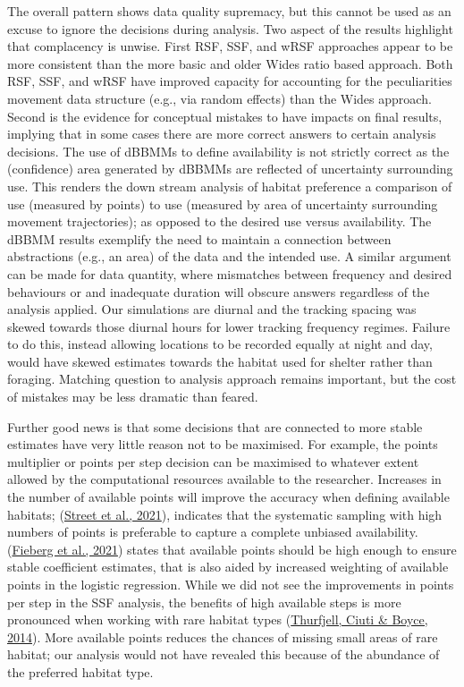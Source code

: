 \documentclass[10pt,a4paper]{article}
\begin{document}
The overall pattern shows data quality supremacy, but this cannot be used as an excuse to ignore the decisions during analysis.
Two aspect of the results highlight that complacency is unwise.
First RSF, SSF, and wRSF approaches appear to be more consistent than the more basic and older Wides ratio based approach.
Both RSF, SSF, and wRSF have improved capacity for accounting for the peculiarities movement data structure (e.g., via random effects) than the Wides approach.
Second is the evidence for conceptual mistakes to have impacts on final results, implying that in some cases there are more correct answers to certain analysis decisions.
The use of dBBMMs to define availability is not strictly correct as the (confidence) area generated by dBBMMs are reflected of uncertainty surrounding use.
This renders the down stream analysis of habitat preference a comparison of use (measured by points) to use (measured by area of uncertainty surrounding movement trajectories); as opposed to the desired use versus availability.
The dBBMM results exemplify the need to maintain a connection between abstractions (e.g., an area) of the data and the intended use.
A similar argument can be made for data quantity, where mismatches between frequency and desired behaviours or and inadequate duration will obscure answers regardless of the analysis applied.
Our simulations are diurnal and the tracking spacing was skewed towards those diurnal hours for lower tracking frequency regimes.
Failure to do this, instead allowing locations to be recorded equally at night and day, would have skewed estimates towards the habitat used for shelter rather than foraging.
Matching question to analysis approach remains important, but the cost of mistakes may be less dramatic than feared.

Further good news is that some decisions that are connected to more stable estimates have very little reason not to be maximised.
For example, the points multiplier or points per step decision can be maximised to whatever extent allowed by the computational resources available to the researcher.
Increases in the number of available points will improve the accuracy when defining available habitats; (\protect\hyperlink{ref-street_solving_2021}{Street et al., 2021}), indicates that the systematic sampling with high numbers of points is preferable to capture a complete unbiased availability.
(\protect\hyperlink{ref-fieberg_how_2021}{Fieberg et al., 2021}) states that available points should be high enough to ensure stable coefficient estimates, that is also aided by increased weighting of available points in the logistic regression.
While we did not see the improvements in points per step in the SSF analysis, the benefits of high available steps is more pronounced when working with rare habitat types (\protect\hyperlink{ref-thurfjell_applications_2014}{Thurfjell, Ciuti \& Boyce, 2014}).
More available points reduces the chances of missing small areas of rare habitat; our analysis would not have revealed this because of the abundance of the preferred habitat type.
\end{document}
